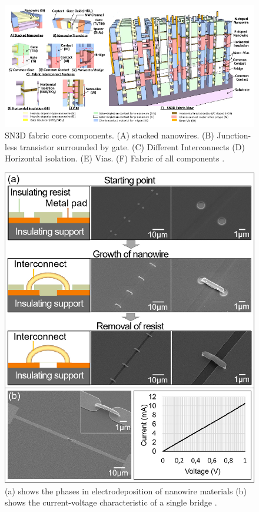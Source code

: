 \documentclass[conference]{IEEEtran}
\begin{document}
\begin{figure}
    \centering
    \includegraphics[width=\textwidth]{figures/3d_cmos.PNG}
    \caption{SN3D fabric core components. (A) stacked nanowires. (B) Junction-less transistor surrounded by gate. (C) Different Interconnects
    (D) Horizontal isolation. (E) Vias. (F) Fabric of all components \cite{8387522}.}\label{fig:3d_cmos}
\end{figure}
\begin{figure}
    \centering
    \includegraphics[width=\linewidth]{figures/electrodepo.png}
    \caption{(a) shows the phases in electrodeposition of nanowire materials (b) shows the current-voltage characteristic of a single bridge
    \cite{8605857}.}\label{fig:electrodepo}
\end{figure}
\end{document}
